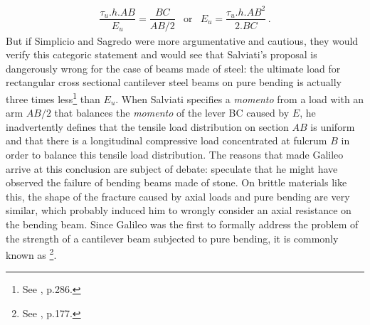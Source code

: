 \begin{eqnarray*}
\dfrac{\tau_u.h.AB}{E_u}=\dfrac{BC}{AB/2}&\text{or}&E_u=\dfrac{\tau_u.h.AB^2}{2.BC}\,.
\end{eqnarray*}
But if Simplicio and Sagredo were more argumentative and cautious, they would verify this categoric statement and would see that Salviati's proposal is dangerously wrong for the case of beams made of steel: the ultimate load for rectangular cross sectional cantilever steel beams on pure bending is actually three times less\footnote{See \cite{popov_1990_1}, p.286.} than $E_u$. When Salviati specifies a \emph{momento} from a load with an arm $AB/2$ that balances the \emph{momento} of the lever BC caused by $E$, he inadvertently defines that the tensile load distribution on section $AB$ is uniform and that there is a longitudinal compressive load concentrated at fulcrum $B$ in order to balance this tensile load distribution. The reasons that made Galileo arrive at this conclusion are subject of debate: \cite{higdon_1981_3} speculate that he might have observed the failure of bending beams made of stone. On brittle materials like this, the shape of the fracture caused by axial loads and pure bending are very similar, which probably induced him to wrongly consider an axial resistance on the bending beam. Since Galileo was the first to formally address the problem of the strength of a cantilever beam subjected to pure bending, it is commonly known as \footnote{See \cite{benvenuto_1991}, p.177.}. 

